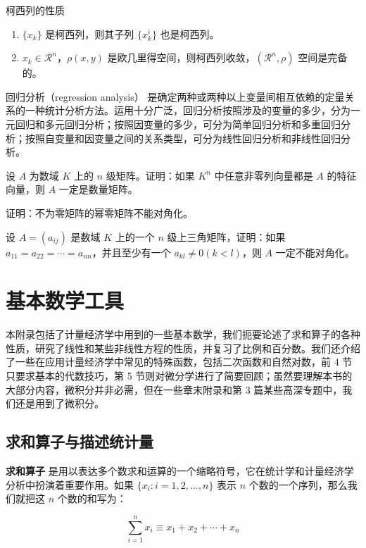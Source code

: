 \documentclass[lang=cn,newtx,10pt,scheme=chinese]{elegantbook}
\begin{document}
\begin{property}\label{property:cauchy}
柯西列的性质
\begin{enumerate}
\item $\{x_k\}$ 是柯西列，则其子列 $\{x_k^i\}$ 也是柯西列。
\item $x_k\in \mathcal{R}^n$，$\rho(x,y)$ 是欧几里得空间，则柯西列收敛，$(\mathcal{R}^n,\rho)$ 空间是完备的。
\end{enumerate}
\end{property}

\begin{conclusion}
回归分析（regression analysis） 是确定两种或两种以上变量间相互依赖的定量关系的一种统计分析方法。运用十分广泛，回归分析按照涉及的变量的多少，分为一元回归和多元回归分析；按照因变量的多少，可分为简单回归分析和多重回归分析；按照自变量和因变量之间的关系类型，可分为线性回归分析和非线性回归分析。
\end{conclusion}

\begin{problemset}
\item 设 $A$ 为数域 $K$ 上的 $n$ 级矩阵。证明：如果 $K^n$ 中任意非零列向量都是 $A$ 的特征向量，则 $A$ 一定是数量矩阵。
\item 证明：不为零矩阵的幂零矩阵不能对角化。
\item 设 $A = (a_{ij})$ 是数域 $K$ 上的一个 $n$ 级上三角矩阵，证明：如果 $a_{11} = a_{22} = \cdots = a_{nn}$，并且至少有一个 $a_{kl} \not = 0 (k < l)$，则 $A$ 一定不能对角化。
\end{problemset}


\nocite{*}
\printbibliography[heading=bibintoc, title=\ebibname]
\appendix

\chapter{基本数学工具}


本附录包括了计量经济学中用到的一些基本数学，我们扼要论述了求和算子的各种性质，研究了线性和某些非线性方程的性质，并复习了比例和百分数。我们还介绍了一些在应用计量经济学中常见的特殊函数，包括二次函数和自然对数，前 4 节只要求基本的代数技巧，第 5 节则对微分学进行了简要回顾；虽然要理解本书的大部分内容，微积分并非必需，但在一些章末附录和第 3 篇某些高深专题中，我们还是用到了微积分。

\section{求和算子与描述统计量}

\textbf{求和算子} 是用以表达多个数求和运算的一个缩略符号，它在统计学和计量经济学分析中扮演着重要作用。如果 $\{x_i: i=1, 2, \ldots, n\}$ 表示 $n$ 个数的一个序列，那么我们就把这 $n$ 个数的和写为：

\begin{equation}
\sum_{i=1}^n x_i \equiv x_1 + x_2 +\cdots + x_n
\end{equation}
\end{document}
